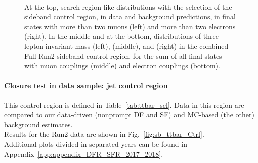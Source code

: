 \begin{figure}[h]
\noindent
  \\
  \caption{At the top, search region-like distributions with the selection of the
    sideband control region, in data and background
    predictions, in final states with more than two muons (left) and
    more than two electrons (right). In the middle and at the bottom, distributions of three-lepton invariant mass (left), \mtwol
    (middle), and \Deltwod (right) in the combined Full-Run2 sideband control region,
    for the sum of all final states with muon couplings (middle) and
    electron couplings (bottom).}
  \label{fig:sb_sr_Ctrl}
\end{figure}

\paragraph*{Closure test in data sample: \PQb jet control region}
This control region is defined in Table~\ref{tab:ttbar_sel}.
Data in this region are compared to our data-driven (nonprompt DF and
SF) and MC-based (the other) background estimates.\\
Results for the Run2 data  are shown in
Fig.~\ref{fig:sb_ttbar_Ctrl}.\\
Additional plots divided in separated years can be found in
Appendix~\ref{app:appendix_DFR_SFR_2017_2018}.

